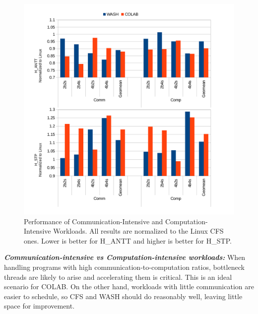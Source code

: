 \begin{figure}
\centering
\includegraphics[scale=0.55]{figures/com.pdf}
\vspace{-0.35cm}
\caption{Performance of Communication-Intensive and Computation-Intensive Workloads. All results are normalized to the Linux CFS ones. Lower is better for H\_ANTT and higher is better for H\_STP.}
\label{com}
\end{figure} 

\textbf{\textit{Communication-intensive vs Computation-intensive workloads:}}
When handling programs with high communication-to-computation ratios, bottleneck threads are likely to arise and accelerating them is critical. This is an ideal scenario for COLAB. On the other hand, workloads with little communication are easier to schedule, so CFS and WASH should do reasonably well, leaving little space for improvement.

